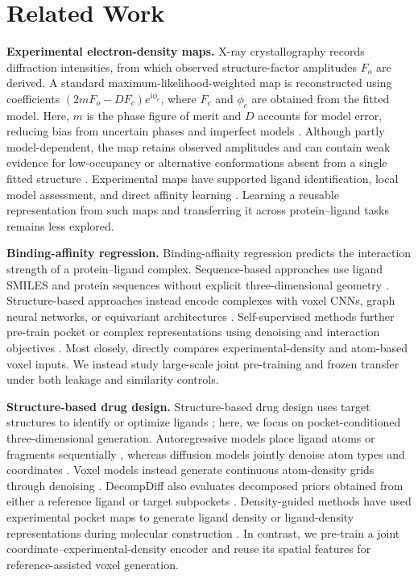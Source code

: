 
\section{Related Work}
\label{sec:related_works}

\textbf{Experimental electron-density maps.}
X-ray crystallography records diffraction intensities, from which observed
structure-factor amplitudes $F_o$ are derived. A standard
maximum-likelihood-weighted map is reconstructed using coefficients
$(2mF_o-DF_c)e^{\mathrm{i}\phi_c}$, where $F_c$ and $\phi_c$ are obtained from
the fitted model. Here, $m$ is the phase figure of merit and $D$ accounts for
model error, reducing bias from uncertain phases and imperfect models
\citep{read1986improved}. Although partly model-dependent, the map retains
observed amplitudes and can contain weak evidence for low-occupancy or
alternative conformations absent from a single fitted structure
\citep{lang2010automated}. Experimental maps have supported ligand
identification, local model assessment, and direct affinity learning
\citep{kowiel2019automatic,miyaguchi2021machine,suriana2025beyond}. Learning a
reusable representation from such maps and transferring it across
protein--ligand tasks remains less explored.

\textbf{Binding-affinity regression.}
Binding-affinity regression predicts the interaction strength of a
protein--ligand complex. Sequence-based approaches use ligand SMILES and
protein sequences without explicit three-dimensional geometry
\citep{ozturk2018deepdta,huang2021moltrans,shenoy2026nesso1}. Structure-based
approaches instead encode complexes with voxel CNNs, graph neural networks, or
equivariant architectures
\citep{stepniewska2018development,kong2026hbgsa,kong2023generalist}.
Self-supervised methods further pre-train pocket or complex representations
using denoising and interaction objectives
\citep{jin2023dsmbind,feng2024protein,gao2024self}. Most closely,
\citet{suriana2025beyond} directly compares experimental-density and atom-based
voxel inputs. We instead study large-scale joint pre-training and frozen
transfer under both leakage and similarity controls.

\textbf{Structure-based drug design.}
Structure-based drug design uses target structures to identify or optimize
ligands \citep{blundell1996structure,anderson2003process}; here, we focus on
pocket-conditioned three-dimensional generation. Autoregressive models place
ligand atoms or fragments sequentially \citep{luo20213d,peng2022pocket2mol},
whereas diffusion models jointly denoise atom types and coordinates
\citep{guan20233d-5e4,schneuing2024structure}. Voxel models instead generate
continuous atom-density grids through denoising
\citep{pinheiro20233d-81b,pinheiro2024structure}. DecompDiff also evaluates
decomposed priors obtained from either a reference ligand or target subpockets
\citep{guan2024decompdiff}. Density-guided methods have used experimental pocket
maps to generate ligand density or ligand-density representations during
molecular construction \citep{wang2022pocket,li2025electron}. In contrast, we
pre-train a joint coordinate--experimental-density encoder and reuse its spatial
features for reference-assisted voxel generation.
